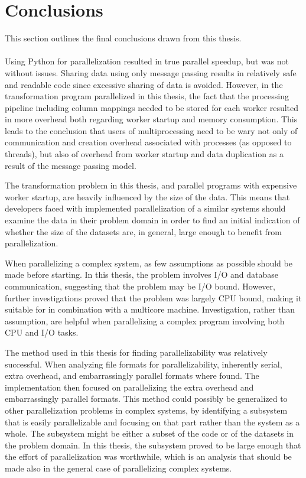 \section{Conclusions}
This section outlines the final conclusions drawn from this thesis. \\\\

Using Python  for parallelization resulted in true parallel speedup, but was not without issues.
Sharing data using only message passing results in relatively safe and readable code since excessive sharing of data is avoided.
However, in the transformation program parallelized in this thesis, the fact that the processing pipeline including column mappings
needed to be stored for each worker resulted in more overhead both regarding worker startup and memory consumption. This
leads to the conclusion that users of multiprocessing need to be wary not only of communication and creation overhead associated
with processes (as opposed to threads), but also of overhead from worker startup and data duplication as a result of the message
passing model.

The transformation problem in this thesis, and parallel programs with expensive worker startup, are heavily influenced by the size
of the data. This means that developers faced with implemented parallelization of a similar systems should examine the data in their
problem domain in order to find an initial indication of whether the size of the datasets are, in general, large enough to benefit
from parallelization.

When parallelizing a complex system, as few assumptions as possible should be made before starting. In this thesis, the problem
involves I/O and database communication, suggesting that the problem may be I/O bound. However, further investigations proved that the problem
was largely CPU bound, making it suitable for  in combination with a multicore machine. Investigation, rather than
assumption, are helpful when parallelizing a complex program involving both CPU and I/O tasks.

The method used in this thesis for finding parallelizability was relatively successful. When analyzing file formats for parallelizability,
inherently serial, extra overhead, and embarrassingly parallel formats where found. The implementation then focused on parallelizing
the extra overhead and embarrassingly parallel formats. This method could possibly be generalized to other parallelization problems
in complex systems, by identifying a subsystem that is easily parallelizable and focusing on that part rather than the system as a whole.
The subsystem might be either a subset of the code or of the datasets in the problem domain. In this thesis, the subsystem proved to be
large enough that the effort of parallelization was worthwhile, which is an analysis that should be made also in the general case of
parallelizing complex systems.

